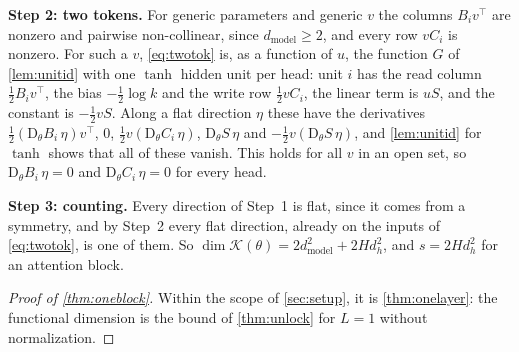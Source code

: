 \documentclass[10pt]{article}
\theoremstyle{definition}
\theoremstyle{remark}
\newcommand{\dm}{d_{\mathrm{model}}}
\newcommand{\Der}{\mathrm{D}}
\newcommand{\para}[1]{\smallskip\noindent\textbf{#1}\hspace{0.5em}}
\begin{document}
\para{Step 2: two tokens.} For generic parameters and generic $v$ the columns $B_iv^\top$ are nonzero and pairwise non-collinear, since $\dm \ge 2$, and every row $vC_i$ is nonzero. For such a $v$, \eqref{eq:twotok} is, as a function of $u$, the function $G$ of \cref{lem:unitid} with one $\tanh$ hidden unit per head: unit $i$ has the read column $\tfrac12B_iv^\top$, the bias $-\tfrac12\log k$ and the write row $\tfrac12vC_i$, the linear term is $uS$, and the constant is $-\tfrac12vS$. Along a flat direction $\eta$ these have the derivatives $\tfrac12(\Der_\theta B_i\,\eta)v^\top$, $0$, $\tfrac12v(\Der_\theta C_i\,\eta)$, $\Der_\theta S\,\eta$ and $-\tfrac12v(\Der_\theta S\,\eta)$, and \cref{lem:unitid} for $\tanh$ shows that all of these vanish. This holds for all $v$ in an open set, so $\Der_\theta B_i\,\eta = 0$ and $\Der_\theta C_i\,\eta = 0$ for every head.

\para{Step 3: counting.} Every direction of Step~1 is flat, since it comes from a symmetry, and by Step~2 every flat direction, already on the inputs of \eqref{eq:twotok}, is one of them. So $\dim\mathcal K(\theta) = 2\dm^2 + 2Hd_h^2$, and $s = 2Hd_h^2$ for an attention block.

\begin{proof}[Proof of \cref{thm:oneblock}]
Within the scope of \cref{sec:setup}, it is \cref{thm:onelayer}: the functional dimension is the bound of \cref{thm:unlock} for $L = 1$ without normalization.
\end{proof}
\end{document}
